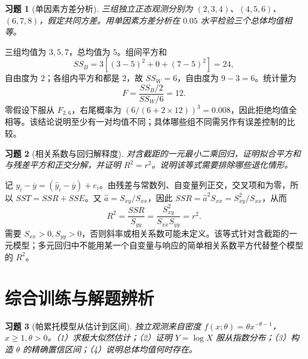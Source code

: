 \documentclass[UTF8,12pt,a4paper,fontset=fandol]{ctexart}
\newtheorem{exercise}{习题}[section]
\begin{document}
\begin{exercise}[单因素方差分析]\label{q:B16.5}
三组独立正态观测分别为 $(2,3,4)$、$(4,5,6)$、$(6,7,8)$，假定共同方差。用单因素方差分析在 $0.05$ 水平检验三个总体均值相等。\par{}
\end{exercise}

\begin{solve}\label{a:B16.5}三组均值为 $3,5,7$，总均值为 $5$。组间平方和\[SS_B=3[(3-5)^2+0+(7-5)^2]=24,\]自由度为 $2$；各组内平方和都是 $2$，故 $SS_W=6$，自由度为 $9-3=6$。统计量为\[F=\frac{SS_B/2}{SS_W/6}=12.\]零假设下服从 $F_{2,6}$，右尾概率为 $(6/(6+2\times12))^3=0.008$，因此拒绝均值全相等。该结论说明至少有一对均值不同；具体哪些组不同需另作有误差控制的比较。\end{solve}

\begin{exercise}[相关系数与回归解释度]\label{q:B16.6}
对含截距的一元最小二乘回归，证明拟合平方和与残差平方和正交分解，并证明 $R^2=r^2$。说明该等式需要排除哪些退化情形。\par{}
\end{exercise}

\begin{solve}\label{a:B16.6}记 $y_i-\overline y=(\widehat y_i-\overline y)+e_i$。由残差与常数列、自变量列正交，交叉项和为零，所以 $SST=SSR+SSE$。又 $\widehat a=S_{xy}/S_{xx}$，因此 $SSR=\widehat a^2S_{xx}=S_{xy}^2/S_{xx}$，从而\[R^2=\frac{SSR}{S_{yy}}=\frac{S_{xy}^2}{S_{xx}S_{yy}}=r^2.\]需要 $S_{xx}>0,S_{yy}>0$，否则斜率或相关系数可能未定义。该等式针对含截距的一元模型；多元回归中不能用某一个自变量与响应的简单相关系数平方代替整个模型的 $R^2$。\end{solve}

\clearpage\section{综合训练与解题辨析}

\begin{exercise}[帕累托模型从估计到区间]\label{q:M-F-5}
独立观测来自密度 $f(x;\theta)=\theta x^{-\theta-1}$，$x\ge1,\theta>0$。（1）求极大似然估计；（2）证明 $Y=\log X$ 服从指数分布；（3）构造 $\theta$ 的精确置信区间；（4）说明总体均值何时存在。\par{}
\end{exercise}
\end{document}
